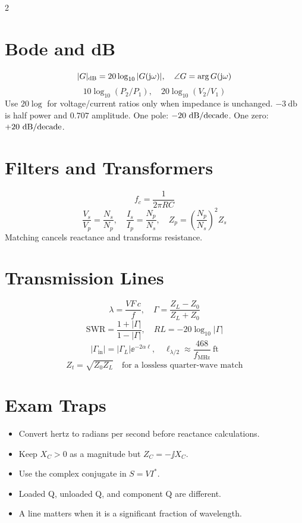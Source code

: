 \documentclass[10pt,letterpaper]{article}
\begin{document}
\begin{multicols}{2}
\section*{Bode and dB}
\[
|G|_{\mathrm{dB}}=20\log_{10}|G(\mathrm{j}\omega)|,\quad
\angle G=\arg G(\mathrm{j}\omega)
\]
\[
10\log_{10}(P_2/P_1),\quad
20\log_{10}(V_2/V_1)
\]
Use \(20\log\) for voltage/current ratios only when impedance is unchanged.
\(-\SI{3}{\decibel}\) is half power and \(0.707\) amplitude. One pole:
\(-20~\mathrm{dB}/\text{decade}\). One zero: \(+20~\mathrm{dB}/\text{decade}\).

\section*{Filters and Transformers}
\[
f_c=\frac{1}{2\pi RC}
\]
\[
\frac{V_s}{V_p}=\frac{N_s}{N_p},\quad
\frac{I_s}{I_p}=\frac{N_p}{N_s},\quad
Z_p=\left(\frac{N_p}{N_s}\right)^2Z_s
\]
Matching cancels reactance and transforms resistance.

\section*{Transmission Lines}
\[
\lambda=\frac{VF\,c}{f},\quad
\Gamma=\frac{Z_L-Z_0}{Z_L+Z_0}
\]
\[
\mathrm{SWR}=\frac{1+|\Gamma|}{1-|\Gamma|},\quad
RL=-20\log_{10}|\Gamma|
\]
\[
|\Gamma_{\mathrm{in}}|=|\Gamma_L|\ee^{-2\alpha\ell},\quad
\ell_{\lambda/2}\approx\frac{468}{f_{\mathrm{MHz}}}\ \mathrm{ft}
\]
\[
Z_t=\sqrt{Z_0Z_L}\quad\text{for a lossless quarter-wave match}
\]

\section*{Exam Traps}
\begin{itemize}
\item Convert hertz to radians per second before reactance calculations.
\item Keep \(X_C>0\) as a magnitude but \(Z_C=-\jj X_C\).
\item Use the complex conjugate in \(S=VI^*\).
\item Loaded Q, unloaded Q, and component Q are different.
\item A line matters when it is a significant fraction of wavelength.
\end{itemize}
\end{multicols}
\end{document}
